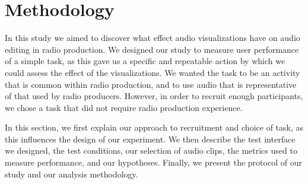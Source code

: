 




\section{Methodology}\label{sec:vis-method}

In this study we aimed to discover what effect audio visualizations have on audio editing in radio production.  We
designed our study to measure user performance of a simple task, as this gave us a specific and repeatable action by
which we could assess the effect of the visualizations.  We wanted the task to be an activity that is common within
radio production, and to use audio that is representative of that used by radio producers.  However, in order to
recruit enough participants, we chose a task that did not require radio production experience.

In this section, we first explain our approach to recruitment and choice of task, as this influences the design of
our experiment. We then describe the test interface we designed, the test conditions, our selection of audio clips, the
metrics used to measure performance, and our hypotheses.  Finally, we present the protocol of our study and our
analysis methodology.

